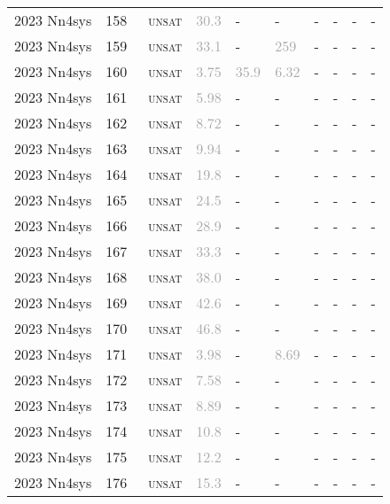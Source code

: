 \begin{center}
{\begin{longtable}{@{}llllllllll@{}}
2023 Nn4sys & 158 & ~\textsc{unsat} & \textcolor{darkgray}{30.3} & - & - & - & - & - & - \\
2023 Nn4sys & 159 & ~\textsc{unsat} & \textcolor{darkgray}{33.1} & - & \textcolor{darkgray}{259} & - & - & - & - \\
2023 Nn4sys & 160 & ~\textsc{unsat} & \textcolor{darkgray}{3.75} & \textcolor{darkgray}{35.9} & \textcolor{darkgray}{6.32} & - & - & - & - \\
2023 Nn4sys & 161 & ~\textsc{unsat} & \textcolor{darkgray}{5.98} & - & - & - & - & - & - \\
2023 Nn4sys & 162 & ~\textsc{unsat} & \textcolor{darkgray}{8.72} & - & - & - & - & - & - \\
2023 Nn4sys & 163 & ~\textsc{unsat} & \textcolor{darkgray}{9.94} & - & - & - & - & - & - \\
2023 Nn4sys & 164 & ~\textsc{unsat} & \textcolor{darkgray}{19.8} & - & - & - & - & - & - \\
2023 Nn4sys & 165 & ~\textsc{unsat} & \textcolor{darkgray}{24.5} & - & - & - & - & - & - \\
2023 Nn4sys & 166 & ~\textsc{unsat} & \textcolor{darkgray}{28.9} & - & - & - & - & - & - \\
2023 Nn4sys & 167 & ~\textsc{unsat} & \textcolor{darkgray}{33.3} & - & - & - & - & - & - \\
2023 Nn4sys & 168 & ~\textsc{unsat} & \textcolor{darkgray}{38.0} & - & - & - & - & - & - \\
2023 Nn4sys & 169 & ~\textsc{unsat} & \textcolor{darkgray}{42.6} & - & - & - & - & - & - \\
2023 Nn4sys & 170 & ~\textsc{unsat} & \textcolor{darkgray}{46.8} & - & - & - & - & - & - \\
2023 Nn4sys & 171 & ~\textsc{unsat} & \textcolor{darkgray}{3.98} & - & \textcolor{darkgray}{8.69} & - & - & - & - \\
2023 Nn4sys & 172 & ~\textsc{unsat} & \textcolor{darkgray}{7.58} & - & - & - & - & - & - \\
2023 Nn4sys & 173 & ~\textsc{unsat} & \textcolor{darkgray}{8.89} & - & - & - & - & - & - \\
2023 Nn4sys & 174 & ~\textsc{unsat} & \textcolor{darkgray}{10.8} & - & - & - & - & - & - \\
2023 Nn4sys & 175 & ~\textsc{unsat} & \textcolor{darkgray}{12.2} & - & - & - & - & - & - \\
2023 Nn4sys & 176 & ~\textsc{unsat} & \textcolor{darkgray}{15.3} & - & - & - & - & - & - \\

\end{longtable}}
\end{center}
